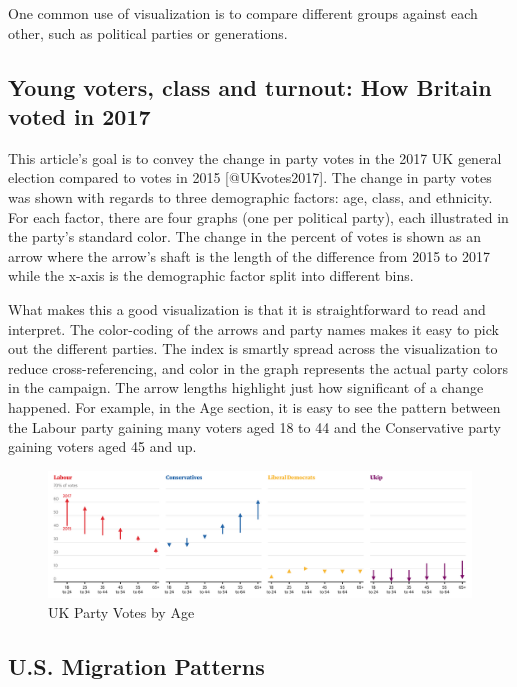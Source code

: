 \documentclass[]{book}
\theoremstyle{definition}
\theoremstyle{definition}
\theoremstyle{definition}
\theoremstyle{remark}
\begin{document}
One common use of visualization is to compare different groups against
each other, such as political parties or generations.

\subsection{Young voters, class and turnout: How Britain voted in
2017}\label{young-voters-class-and-turnout-how-britain-voted-in-2017}

This article's goal is to convey the change in party votes in the 2017
UK general election compared to votes in 2015 {[}@UKvotes2017{]}. The
change in party votes was shown with regards to three demographic
factors: age, class, and ethnicity. For each factor, there are four
graphs (one per political party), each illustrated in the party's
standard color. The change in the percent of votes is shown as an arrow
where the arrow's shaft is the length of the difference from 2015 to
2017 while the x-axis is the demographic factor split into different
bins.

What makes this a good visualization is that it is straightforward to
read and interpret. The color-coding of the arrows and party names makes
it easy to pick out the different parties. The index is smartly spread
across the visualization to reduce cross-referencing, and color in the
graph represents the actual party colors in the campaign. The arrow
lengths highlight just how significant of a change happened. For
example, in the Age section, it is easy to see the pattern between the
Labour party gaining many voters aged 18 to 44 and the Conservative
party gaining voters aged 45 and up.

\begin{figure}
\centering
\includegraphics{images/Party_Votes_by_Age.png}
\caption{UK Party Votes by Age}
\end{figure}

\subsection{U.S. Migration Patterns}\label{u.s.-migration-patterns}
\end{document}
